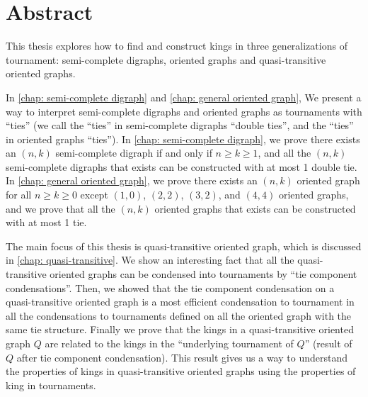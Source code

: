 \chapter{Abstract}

This thesis explores how to find and construct kings
in three generalizations of tournament:
semi-complete digraphs, oriented graphs and
quasi-transitive oriented graphs.

In \cref{chap: semi-complete digraph} and \cref{chap: general oriented graph},
We present a way to interpret semi-complete digraphs
and oriented graphs as tournaments with ``ties''
(we call the ``ties'' in semi-complete digraphs ``double ties'',
and the ``ties'' in oriented graphs ``ties'').
In \cref{chap: semi-complete digraph},
we prove there exists an \((n, k)\) semi-complete digraph
if and only if \(n \geq k \geq 1\),
and all the \((n, k)\) semi-complete digraphs that exists
can be constructed with at most 1 double tie.
In \cref{chap: general oriented graph},
we prove there exists an \((n, k)\) oriented graph
for all \(n \geq k \geq 0\) except
\((1,0)\), \((2,2)\), \((3,2)\), and \((4,4)\) oriented graphs,
and we prove that
all the \((n, k)\) oriented graphs that exists
can be constructed with at most 1 tie.

The main focus of this thesis is quasi-transitive oriented graph,
which is discussed in \cref{chap: quasi-transitive}.
We show an interesting fact that
all the quasi-transitive oriented graphs
can be condensed into tournaments by
``tie component condensations''.
Then, we showed that the tie component condensation
on a quasi-transitive oriented graph
is a most efficient condensation to tournament
in all the condensations to tournaments
defined on all the oriented graph with the same tie structure.
Finally we prove that the kings in
a quasi-transitive oriented graph \(Q\)
are related to
the kings in the ``underlying tournament of \(Q\)''
(result of \(Q\) after tie component condensation).
This result gives us a way to understand the
properties of kings in quasi-transitive oriented graphs
using the properties of king in tournaments.
